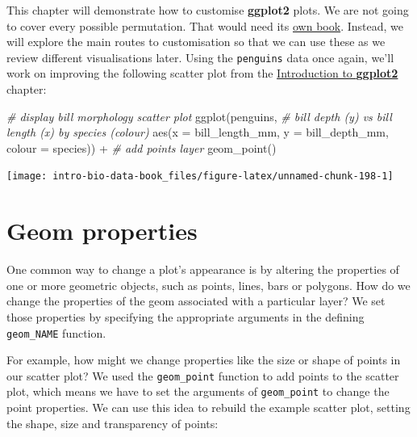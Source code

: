 \documentclass[
]{book}
\newenvironment{Shaded}{\begin{snugshade}}{\end{snugshade}}
\newcommand{\AttributeTok}[1]{\textcolor[rgb]{0.77,0.63,0.00}{#1}}
\newcommand{\CommentTok}[1]{\textcolor[rgb]{0.56,0.35,0.01}{\textit{#1}}}
\newcommand{\FunctionTok}[1]{\textcolor[rgb]{0.00,0.00,0.00}{#1}}
\newcommand{\NormalTok}[1]{#1}
\newcommand{\SpecialCharTok}[1]{\textcolor[rgb]{0.00,0.00,0.00}{#1}}
\begin{document}
This chapter will demonstrate how to customise \textbf{ggplot2} plots. We are not going to cover every possible permutation. That would need its \href{https://ggplot2-book.org/}{own book}. Instead, we will explore the main routes to customisation so that we can use these as we review different visualisations later. Using the \texttt{penguins} data once again, we'll work on improving the following scatter plot from the \protect\hyperlink{chapter-ggplot2-intro}{Introduction to \textbf{ggplot2}} chapter:

\begin{Shaded}
\begin{Highlighting}[]
\CommentTok{\# display bill morphology scatter plot}
\FunctionTok{ggplot}\NormalTok{(penguins, }
       \CommentTok{\# bill depth (y) vs bill length (x) by species (colour)}
       \FunctionTok{aes}\NormalTok{(}\AttributeTok{x =}\NormalTok{ bill\_length\_mm, }\AttributeTok{y =}\NormalTok{ bill\_depth\_mm, }\AttributeTok{colour =}\NormalTok{ species)) }\SpecialCharTok{+} 
  \CommentTok{\# add points layer}
  \FunctionTok{geom\_point}\NormalTok{()}
\end{Highlighting}
\end{Shaded}

\begin{center}\texttt{[image: intro-bio-data-book\_files/figure-latex/unnamed-chunk-198-1]} \end{center}

\hypertarget{geom-properties}{%
\section{Geom properties}\label{geom-properties}}

One common way to change a plot's appearance is by altering the properties of one or more geometric objects, such as points, lines, bars or polygons. How do we change the properties of the geom associated with a particular layer? We set those properties by specifying the appropriate arguments in the defining \texttt{geom\_NAME} function.

For example, how might we change properties like the size or shape of points in our scatter plot? We used the \texttt{geom\_point} function to add points to the scatter plot, which means we have to set the arguments of \texttt{geom\_point} to change the point properties. We can use this idea to rebuild the example scatter plot, setting the shape, size and transparency of points:
\end{document}
